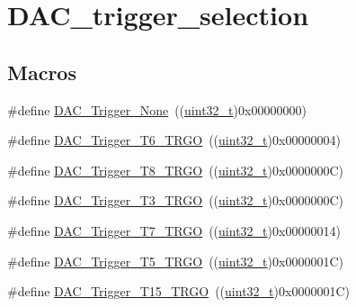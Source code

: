 \hypertarget{group___d_a_c__trigger__selection}{}\section{D\+A\+C\+\_\+trigger\+\_\+selection}
\label{group___d_a_c__trigger__selection}
\subsection*{Macros}
\begin{DoxyCompactItemize}
\item 
\#define \hyperlink{group___d_a_c__trigger__selection_ga7849138e043267668d755390d923e4ba}{D\+A\+C\+\_\+\+Trigger\+\_\+\+None}~((\hyperlink{_p_e___types_8h_a33594304e786b158f3fb30289278f5af}{uint32\+\_\+t})0x00000000)
\item 
\#define \hyperlink{group___d_a_c__trigger__selection_ga083307783678a2f1d3066db57dc84cfe}{D\+A\+C\+\_\+\+Trigger\+\_\+\+T6\+\_\+\+T\+R\+GO}~((\hyperlink{_p_e___types_8h_a33594304e786b158f3fb30289278f5af}{uint32\+\_\+t})0x00000004)
\item 
\#define \hyperlink{group___d_a_c__trigger__selection_ga756700c6621eadb807e21a16966580a0}{D\+A\+C\+\_\+\+Trigger\+\_\+\+T8\+\_\+\+T\+R\+GO}~((\hyperlink{_p_e___types_8h_a33594304e786b158f3fb30289278f5af}{uint32\+\_\+t})0x0000000\+C)
\item 
\#define \hyperlink{group___d_a_c__trigger__selection_ga82cbaedc35164c8b9fe0be2faec9b909}{D\+A\+C\+\_\+\+Trigger\+\_\+\+T3\+\_\+\+T\+R\+GO}~((\hyperlink{_p_e___types_8h_a33594304e786b158f3fb30289278f5af}{uint32\+\_\+t})0x0000000\+C)
\item 
\#define \hyperlink{group___d_a_c__trigger__selection_ga9b92d497746be54af46ae4e9c1fc4a6f}{D\+A\+C\+\_\+\+Trigger\+\_\+\+T7\+\_\+\+T\+R\+GO}~((\hyperlink{_p_e___types_8h_a33594304e786b158f3fb30289278f5af}{uint32\+\_\+t})0x00000014)
\item 
\#define \hyperlink{group___d_a_c__trigger__selection_ga35352cebfd1ae8a3d63e374a5d86a85d}{D\+A\+C\+\_\+\+Trigger\+\_\+\+T5\+\_\+\+T\+R\+GO}~((\hyperlink{_p_e___types_8h_a33594304e786b158f3fb30289278f5af}{uint32\+\_\+t})0x0000001\+C)
\item 
\#define \hyperlink{group___d_a_c__trigger__selection_ga9f738c0c1366a588ac4fa9e060278c70}{D\+A\+C\+\_\+\+Trigger\+\_\+\+T15\+\_\+\+T\+R\+GO}~((\hyperlink{_p_e___types_8h_a33594304e786b158f3fb30289278f5af}{uint32\+\_\+t})0x0000001\+C)
\item 

\end{DoxyCompactItemize}
